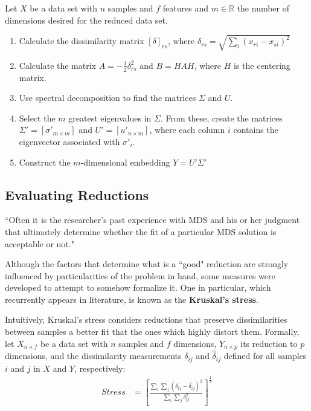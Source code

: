 \documentclass[12pt]{article}
\begin{document}
Let $X$ be a data set with $n$ samples and $f$ features and $m\in\mathbb{R}$ the number of dimensions desired for the reduced data set. \cite{cox2001}

\begin{enumerate}
	\item Calculate the dissimilarity matrix $[\delta]_{rs}$, where $\delta_{rs} = \sqrt{\sum_i (x_{ri} - x_{si})^2}$
	\item Calculate the matrix $A=-\frac{1}{2}\delta_{rs}^2$ and $B=HAH$, where $H$ is the centering matrix.

	\item Use spectral decomposition to find the matrices $\Sigma$ and $U$.

	\item Select the $m$ greatest eigenvalues in $\Sigma$. From these, create the matrices $\Sigma'=[\sigma'_{m\times m}]$ and $U'=[u'_{n\times m}]$, where each column $i$ contains the eigenvector associated with $\sigma'_i$.

	\item Construct the $m$-dimensional embedding $Y=U'\Sigma'$
\end{enumerate}

\subsection{Evaluating Reductions}

``Often it is the researcher's past experience with MDS and his or her judgment that
ultimately determine whether the fit of a particular MDS solution is acceptable or not." \cite{naes1996multivariate}

Although the factors that determine what is a ``good" reduction are strongly influenced by particularities of the problem in hand, some measures were developed to attempt to somehow formalize it. One in particular, which recurrently appears in literature, is known as the \textbf{Kruskal's stress}.

Intuitively, Kruskal's stress \cite{naes1996multivariate} considers reductions that preserve dissimilarities between samples a better fit that the ones which highly distort them. Formally, let $X_{n \times f}$ be a data set with $n$ samples and $f$ dimensions, $Y_{n \times p}$ its reduction to $p$ dimensions, and the dissimilarity measurements $\delta_{ij}$ and $\hat{\delta}_{ij}$ defined for all samples $i$ and $j$ in $X$ and $Y$, respectively:
\begin{align*}
	Stress &= [\frac{\sum_i \sum_j (\delta_{ij} - \hat{\delta}_{ij})^2}{\sum_i \sum_j \delta_{ij}^2}]^{\frac{1}{2}}
\end{align*}
\end{document}
